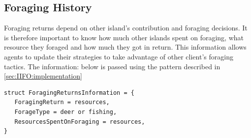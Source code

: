 \subsection{Foraging History}
\label{subsec:IIFO:foraging_history}
Foraging returns depend on other island's contribution and foraging decisions. It is therefore important to know how much other islands spent on foraging, what resource they foraged and how much they got in return. This information allows agents to update their strategies to take advantage of other client's foraging tactics. The information: below is passed using the pattern described in \ref{sec:IIFO:implementation}
\begin{verbatim}
struct ForagingReturnsInformation = {
   ForagingReturn = resources,
   ForageType = deer or fishing,
   ResourcesSpentOnForaging = resources,
}
\end{verbatim}

